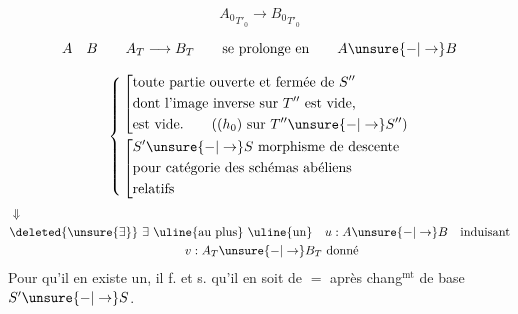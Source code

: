 
\[
{A_0}_{T'_0}\longrightarrow {B_0}_{T'_0}
\]

\[
A\quad B\qquad A_T\longrightarrow B_T\qquad\text{se prolonge en}\qquad A\unsure{-|\to}B
\]


\[
\left\{\begin{aligned}
&\left[\begin{aligned}&\text{toute partie ouverte et fermée de }S''\\
&\text{dont l'image inverse sur }T''\text{ est vide,}\\
&\text{est vide.}\qquad ((h_0)\text{ sur }T''\unsure{-|\to}S'')\end{aligned}\right.\\
&\left[\begin{aligned}& S'\unsure{-|\to}S\text{ morphisme de descente}\\
&\text{pour catégorie des schémas abéliens}\\
&\text{relatifs}\end{aligned}\right.
\end{aligned}\right.
\]
\[
\begin{aligned}
&\Downarrow\\
&\deleted{\unsure{\exists}}\ \exists\ \text{\uline{au plus} \uline{un}}\quad u:A\unsure{-|\to}B\quad\text{induisant}\\
&\hspace{5cm}v:A_T\unsure{-|\to}B_T\ \text{donné}
\end{aligned}
\]
Pour qu'il en  existe un, il f. et s. qu'il en soit de $=$ après chang$^{\mathrm{mt}}$ de base $S'\unsure{-|\to}S$.
